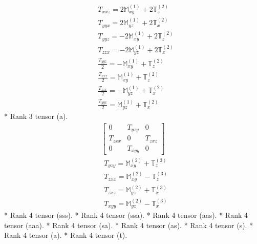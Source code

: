 \documentclass[fleqn,8pt,landscape]{jsarticle}
\begin{document}
\begin{align*}
& T_{xxz} = 2 \mathbb{M}_{xy}^{(1)} + 2 \mathbb{T}_{z}^{(2)} \\
& T_{yyx} = 2 \mathbb{M}_{yz}^{(1)} + 2 \mathbb{T}_{x}^{(2)} \\
& T_{yyz} = - 2 \mathbb{M}_{xy}^{(1)} + 2 \mathbb{T}_{z}^{(2)} \\
& T_{zzx} = - 2 \mathbb{M}_{yz}^{(1)} + 2 \mathbb{T}_{x}^{(2)} \\
& \frac{T_{yyz}}{2} = - \mathbb{M}_{xy}^{(1)} + \mathbb{T}_{z}^{(2)} \\
& \frac{T_{xxz}}{2} = \mathbb{M}_{xy}^{(1)} + \mathbb{T}_{z}^{(2)} \\
& \frac{T_{zzx}}{2} = - \mathbb{M}_{yz}^{(1)} + \mathbb{T}_{x}^{(2)} \\
& \frac{T_{yyx}}{2} = \mathbb{M}_{yz}^{(1)} + \mathbb{T}_{x}^{(2)}
\end{align*}
* Rank 3 tensor (a).
\begin{align*}
\begin{bmatrix} 0 & T_{yzy} & 0 \\ T_{zxx} & 0 & T_{zxz} \\ 0 & T_{xyy} & 0 \end{bmatrix}
\end{align*}
\begin{align*}
& T_{yzy} = \mathbb{M}_{xy}^{(2)} + \mathbb{T}_{z}^{(3)} \\
& T_{zxx} = \mathbb{M}_{xy}^{(2)} - \mathbb{T}_{z}^{(3)} \\
& T_{zxz} = \mathbb{M}_{yz}^{(2)} + \mathbb{T}_{x}^{(3)} \\
& T_{xyy} = \mathbb{M}_{yz}^{(2)} - \mathbb{T}_{x}^{(3)}
\end{align*}
* Rank 4 tensor (sss).
* Rank 4 tensor (ssa).
* Rank 4 tensor (aas).
* Rank 4 tensor (aaa).
* Rank 4 tensor (sa).
* Rank 4 tensor (as).
* Rank 4 tensor (s).
* Rank 4 tensor (a).
* Rank 4 tensor (t).
\end{document}

